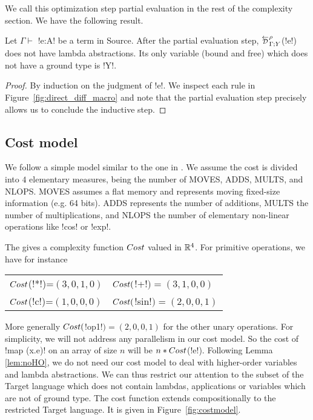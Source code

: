 We call this optimization step partial evaluation in the rest of the complexity section. 
We have the following result.

\begin{lemma}
    \label{lem:noHO}
    Let $\Gamma \vdash$ !e:A! be a term in Source. 
    After the partial evaluation step, $\directD{\rho}{\Gamma}{Y}$(!e!) does not have lambda abstractions.
    Its only variable (bound and free) which does not have a ground type is !Y!.
\end{lemma}

\begin{proof}
    By induction on the judgment of !e!. 
    We inspect each rule in Figure~\ref{fig:direct_diff_macro} 
    and note that the partial evaluation step precisely allows us to conclude the inductive step.
\end{proof}

\subsection{Cost model}
\label{sub:costModel}

We follow a simple model similar to the one in \cite{griewank2008evaluating}.
We assume the cost is divided into $4$ elementary measures, being the number of MOVES, ADDS, MULTS, and NLOPS.
MOVES assumes a flat memory and represents moving fixed-size information (e.g. 64 bits). 
ADDS represents the number of additions, 
MULTS the number of multiplications, 
and NLOPS the number of elementary non-linear operations like !cos! or !exp!.

The gives a complexity function $Cost$ valued in $\mathbb{R}^4$. 
For primitive operations, we have for instance

\begin{tabular}{ll}
    $Cost$(!*!)=$(3,0,1,0)$ & $Cost($!+!$)=(3,1,0,0)$\\
    $Cost$(!c!)=$(1,0,0,0)$ & $Cost($!sin!$)=(2,0,0,1)$
\end{tabular}

More generally $Cost($!op1!$)=(2,0,0,1)$ for the other unary operations.
For simplicity, we will not address any parallelism in our cost model. 
So the cost of !map (x.e)! on an array of size $n$ will be $n*Cost$(!e!).
Following Lemma \ref{lem:noHO}, we do not need our cost model to deal with higher-order variables and lambda abstractions.
We can thus restrict our attention to the subset of the Target language which does not contain lambdas, applications or variables which are not of ground type.
The cost function extends compositionally to the restricted Target language. 
It is given in Figure~\ref{fig:costmodel}.


